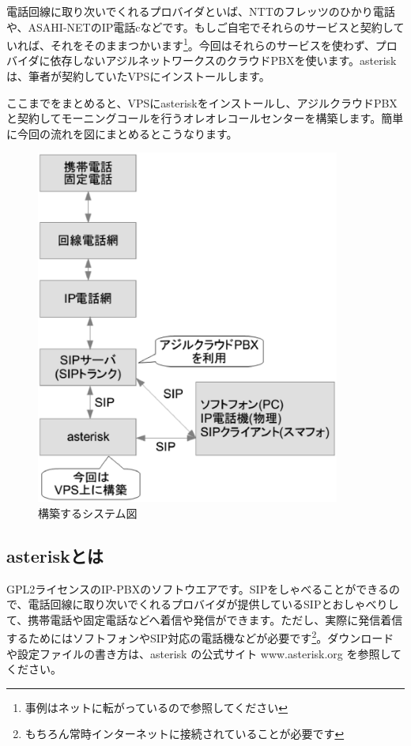 電話回線に取り次いでくれるプロバイダといば、NTTのフレッツのひかり電話や、ASAHI-NETのIP電話cなどです。もしご自宅でそれらのサービスと契約していれば、それをそのままつかいます\footnote{事例はネットに転がっているので参照してください}。今回はそれらのサービスを使わず、プロバイダに依存しないアジルネットワークスのクラウドPBXを使います。asteriskは、筆者が契約していたVPSにインストールします。

ここまでをまとめると、VPSにasteriskをインストールし、アジルクラウドPBXと契約してモーニングコールを行うオレオレコールセンターを構築します。簡単に今回の流れを図にまとめるとこうなります。

\begin{figure}[htbp]
 \begin{center}
  \includegraphics[width=100mm]{tboffice-asterisk/img/gaiyou.eps}
 \end{center}
 \caption{構築するシステム図}
 \label{fig:gaiyou}
\end{figure}

\subsection{asteriskとは}
GPL2ライセンスのIP-PBXのソフトウエアです。SIPをしゃべることができるので、電話回線に取り次いでくれるプロバイダが提供しているSIPとおしゃべりして、携帯電話や固定電話などへ着信や発信ができます。ただし、実際に発信着信するためにはソフトフォンやSIP対応の電話機などが必要です\footnote{もちろん常時インターネットに接続されていることが必要です}。ダウンロードや設定ファイルの書き方は、asterisk の公式サイト www.asterisk.org を参照してください。

